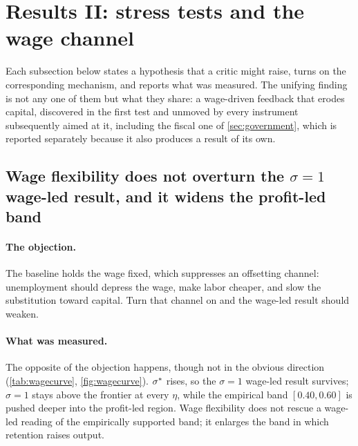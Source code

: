 
\section{Results II: stress tests and the wage channel}
\label{sec:stress}

Each subsection below states a hypothesis that a critic might raise, turns on
the corresponding mechanism, and reports what was measured. The unifying
finding is not any one of them but what they share: a wage-driven feedback
that erodes capital, discovered in the first test and unmoved by every
instrument subsequently aimed at it, including the fiscal one of
\cref{sec:government}, which is reported separately because it also produces
a result of its own.

\subsection{Wage flexibility does not overturn the
\texorpdfstring{$\sigma = 1$}{sigma = 1} wage-led result, and it widens the
profit-led band}
\label{sec:wagecurve}

\paragraph{The objection.} The baseline holds the wage fixed, which suppresses
an offsetting channel: unemployment should depress the wage, make labor
cheaper, and slow the substitution toward capital. Turn that channel on and
the wage-led result should weaken.

\paragraph{What was measured.} The opposite of the objection happens, though
not in the obvious direction (\cref{tab:wagecurve}, \cref{fig:wagecurve}). $\sigma^{\ast}$ rises, so the $\sigma = 1$ wage-led
result survives; $\sigma = 1$ stays above the frontier at every $\eta$,
while the empirical band $[0.40, 0.60]$ is pushed deeper into the
profit-led region. Wage flexibility does not rescue a wage-led reading of the
empirically supported band; it enlarges the band in which retention raises
output.

